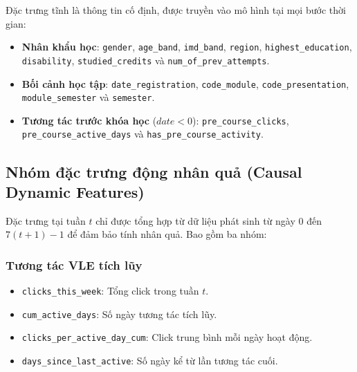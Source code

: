 Đặc trưng tĩnh là thông tin cố định, được truyền vào mô hình tại mọi bước thời gian:
\begin{itemize}[noitemsep,topsep=0pt]
    \item \textbf{Nhân khẩu học}: \texttt{gender}, \allowbreak \texttt{age\_}\allowbreak\texttt{band}, \allowbreak \texttt{imd\_}\allowbreak\texttt{band}, \allowbreak \texttt{region}, \allowbreak \texttt{highest\_}\allowbreak\texttt{edu}\allowbreak\texttt{cation}, \allowbreak \texttt{disability}, \allowbreak \texttt{studied\_}\allowbreak\texttt{credits} và \texttt{num\_}\allowbreak\texttt{of\_}\allowbreak\texttt{prev\_}\allowbreak\texttt{attempts}.
    \item \textbf{Bối cảnh học tập}: \texttt{date\_}\allowbreak\texttt{regis}\allowbreak\texttt{tration}, \allowbreak \texttt{code\_}\allowbreak\texttt{module}, \allowbreak \texttt{code\_}\allowbreak\texttt{presen}\allowbreak\texttt{tation}, \allowbreak \texttt{module\_}\allowbreak\texttt{semes}\allowbreak\texttt{ter} và \texttt{semester}.
    \item \textbf{Tương tác trước khóa học} ($date < 0$): \texttt{pre\_}\allowbreak\texttt{course\_}\allowbreak\texttt{clicks}, \allowbreak \texttt{pre\_}\allowbreak\texttt{course\_}\allowbreak\texttt{active\_}\allowbreak\texttt{days} và \texttt{has\_}\allowbreak\texttt{pre\_}\allowbreak\texttt{course\_}\allowbreak\texttt{activity}.
\end{itemize}

\subsection{Nhóm đặc trưng động nhân quả (Causal Dynamic Features)}

Đặc trưng tại tuần $t$ chỉ được tổng hợp từ dữ liệu phát sinh từ ngày $0$ đến $7(t+1) - 1$ để đảm bảo tính nhân quả. Bao gồm ba nhóm:

\subsubsection{Tương tác VLE tích lũy}
\begin{itemize}[noitemsep,topsep=0pt]
    \item \texttt{clicks\_this\_week}: Tổng click trong tuần $t$.
    \item \texttt{cum\_active\_days}: Số ngày tương tác tích lũy.
    \item \texttt{clicks\_per\_active\_day\_cum}: Click trung bình mỗi ngày hoạt động.
    \item \texttt{days\_since\_last\_active}: Số ngày kể từ lần tương tác cuối.
\end{itemize}


